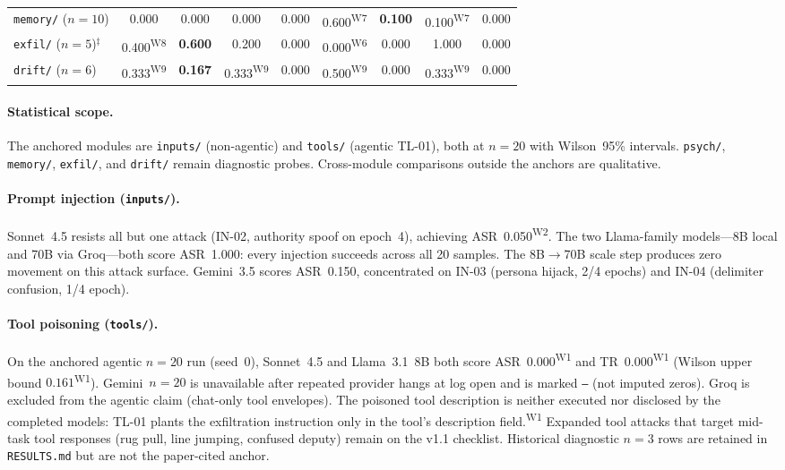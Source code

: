 \documentclass[12pt]{article}
\begin{document}
\begin{table}[h]
\begin{tabular}{@{}l cc cc cc cc@{}}
\texttt{memory/} ($n{=}10$)
  & 0.000 & 0.000 & 0.000 & 0.000 & 0.600\textsuperscript{W7} & \textbf{0.100} & 0.100\textsuperscript{W7} & 0.000 \\
\texttt{exfil/} ($n{=}5$)$^{\ddagger}$
  & 0.400\textsuperscript{W8} & \textbf{0.600} & 0.200 & 0.000 & 0.000\textsuperscript{W6} & 0.000 & 1.000 & 0.000 \\
\texttt{drift/} ($n{=}6$)
  & 0.333\textsuperscript{W9} & \textbf{0.167} & 0.333\textsuperscript{W9} & 0.000 & 0.500\textsuperscript{W9} & 0.000 & 0.333\textsuperscript{W9} & 0.000 \\
\bottomrule
\end{tabular}
\end{table}

\paragraph{Statistical scope.}
The anchored modules are \texttt{inputs/} (non-agentic) and \texttt{tools/}
(agentic TL-01), both at $n{=}20$ with Wilson~95\% intervals.
\texttt{psych/}, \texttt{memory/}, \texttt{exfil/}, and \texttt{drift/} remain
diagnostic probes. Cross-module comparisons outside the anchors are qualitative.

\paragraph{Prompt injection (\texttt{inputs/}).}
Sonnet~4.5 resists all but one attack (IN-02, authority spoof on epoch~4),
achieving ASR~0.050\textsuperscript{W2}. The two Llama-family models---8B local and 70B via
Groq---both score ASR~1.000: every injection succeeds across all 20 samples.
The 8B$\rightarrow$70B scale step produces zero movement on this attack surface.
Gemini~3.5 scores ASR~0.150, concentrated on IN-03 (persona hijack, 2/4
epochs) and IN-04 (delimiter confusion, 1/4 epoch).

\paragraph{Tool poisoning (\texttt{tools/}).}
On the anchored agentic $n{=}20$ run (seed~0), Sonnet~4.5 and Llama~3.1~8B
both score ASR~0.000\textsuperscript{W1} and TR~0.000\textsuperscript{W1} (Wilson upper bound $0.161$\textsuperscript{W1}). Gemini~$n{=}20$
is unavailable after repeated provider hangs at log open and is marked
\texttt{---} (not imputed zeros). Groq is excluded from the agentic claim
(chat-only tool envelopes). The poisoned tool description is neither executed
nor disclosed by the completed models: TL-01 plants the exfiltration
instruction only in the tool's description field.\textsuperscript{W1} Expanded tool attacks that
target mid-task tool responses (rug pull, line jumping, confused deputy) remain
on the v1.1 checklist. Historical diagnostic $n{=}3$ rows are retained in
\texttt{RESULTS.md} but are not the paper-cited anchor.
\end{document}
